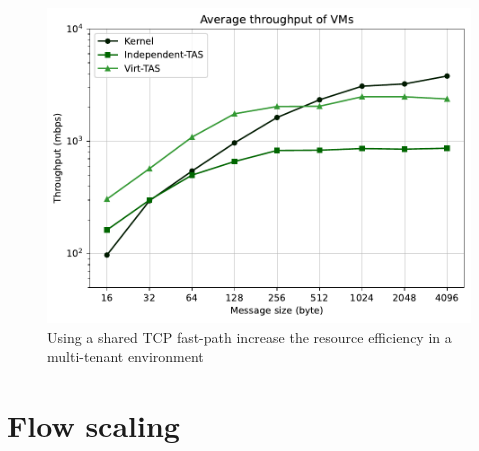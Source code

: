 \begin{figure}
    \centering
    \includegraphics[scale=0.8]{../results/multiplex.throughput.pdf}
    \caption{Using a shared TCP fast-path increase the resource efficiency in  a multi-tenant environment}
    \label{fig:multiplex.throughput}
\end{figure}



\section{Flow scaling}